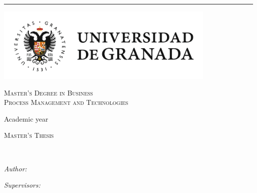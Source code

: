 \documentclass[
11pt, %
english, %
singlespacing, %
headsepline, %
]{MastersDoctoralThesis} %
\def\listtablename{List of Tables}%
\def\tablename{Tabla}%
\begin{document}
\renewcommand{\listtablename}{List of Tables}
\renewcommand{\tablename}{Tabla} 

\frontmatter %

\pagestyle{plain} %


\begin{titlepage}
\begin{center}

  \vspace*{.06\textheight}
  \textcolor{mdtGreen}{\rule{\textwidth}{10pt}}
\includegraphics[width=0.8\textwidth]{UGR/ugr}

\textsc{\LARGE Master's Degree in Business \\ Process Management and Technologies} %

Academic year \cursoAcademico


\vspace{1cm}\textsc{Master's Thesis}\vspace{0.5cm}

{\huge \bfseries \ttitle\par}\vspace{0.4cm} %
\HRule \\[1.5cm] %
 
\begin{minipage}[t]{0.4\textwidth}
\begin{flushleft} \large
\emph{Author:}\\
\href{}{\authorname} %
\end{flushleft}
\end{minipage}
\begin{minipage}[t]{0.4\textwidth}
\begin{flushright} \large
\emph{Supervisors:} \\
\supname
{}
\end{flushright}
\end{minipage}
\end{center}
\end{titlepage}
\end{document}
